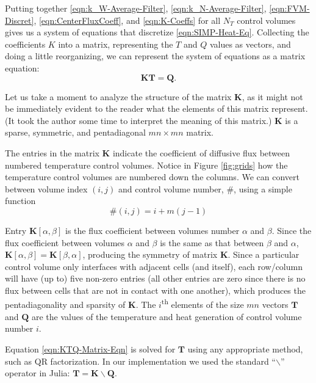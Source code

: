 Putting together \eqref{eqn:k_W-Average-Filter}, \eqref{eqn:k_N-Average-Filter}, \eqref{eqn:FVM-Discret}, \eqref{eqn:CenterFluxCoeff}, and \eqref{eqn:K-Coeffs} for all $N_T$ control volumes gives us a system of equations that discretize \eqref{eqn:SIMP-Heat-Eq}. Collecting the coefficients $K$ into a matrix, representing the $T$ and $Q$ values as vectors, and doing a little reorganizing, we can represent the system of equations as a matrix equation:
\begin{equation}
	\mathbf{K}\mathbf{T}=\mathbf{Q}.\label{eqn:KTQ-Matrix-Eqn}
\end{equation}

Let us take a moment to analyze the structure of the matrix $\mathbf{K}$, as it might not be immediately evident to the reader what the elements of this matrix represent. (It took the author some time to interpret the meaning of this matrix.) $\mathbf{K}$ is a sparse, symmetric, and pentadiagonal $mn\times mn$ matrix.

The entries in the matrix $\mathbf{K}$ indicate the coefficient of diffusive flux between numbered temperature control volumes. Notice in Figure \ref{fig:grids} how the temperature control volumes are numbered down the columns. We can convert between volume index $(i,j)$ and control volume number, $\#$, using a simple function
\begin{equation}
	\#(i,j)=i+m(j-1)\label{eqn:cord2num}
\end{equation}

Entry $\mathbf{K}[\alpha,\beta]$ is the flux coefficient between volumes number $\alpha$ and $\beta$. Since the flux coefficient between volumes $\alpha$ and $\beta$ is the same as that between $\beta$ and $\alpha$, $\mathbf{K}[\alpha,\beta]=\mathbf{K}[\beta,\alpha]$, producing the symmetry of matrix $\mathbf{K}$. Since a particular control volume only interfaces with adjacent cells (and itself), each row/column will have (up to) five non-zero entries (all other entries are zero since there is no flux between cells that are not in contact with one another), which produces the pentadiagonality and sparsity of $\mathbf{K}$. The $i$\textsuperscript{th} elements of the size $mn$ vectors $\mathbf{T}$ and $\mathbf{Q}$ are the values of the temperature and heat generation of control volume number $i$.

Equation \eqref{eqn:KTQ-Matrix-Eqn} is solved for $\mathbf{T}$ using any appropriate method, such as QR factorization. In our implementation we used the standard ``$\backslash$'' operator in Julia: $\mathbf{T}=\mathbf{K}\backslash\mathbf{Q}$.

